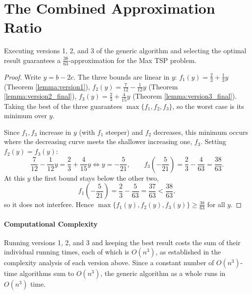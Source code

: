 \section{The Combined Approximation Ratio}
\begin{theorem} \label{thm:final_approximation}
Executing versions 1, 2, and 3 of the generic algorithm and selecting the
optimal result guarantees a $\frac{38}{63}$-approximation for the Max TSP
problem.
\end{theorem}

\begin{proof}
Write $y = b - 2c$. The three bounds are linear in $y$: $f_1(y) =
\frac23+\frac13y$ (Theorem \ref{lemma:version1}), $f_2(y) =
\frac{7}{12}-\frac1{12}y$ (Theorem \ref{lemma:version2_final}), $f_3(y) =
\frac23+\frac4{15}y$ (Theorem \ref{lemma:version3_final}). Taking the best of
the three guarantees $\max\{f_1,f_2,f_3\}$, so the worst case is its minimum
over $y$.

Since $f_1, f_3$ increase in $y$ (with $f_1$ steeper) and $f_2$ decreases, this
minimum occurs where the decreasing curve meets the shallower increasing one,
$f_3$. Setting $f_2(y) = f_3(y)$:
\begin{equation}
\frac{7}{12}-\frac{1}{12}y = \frac23+\frac4{15}y \iff y = -\frac{5}{21}, \qquad f_3\left(-\frac{5}{21}\right) = \frac23-\frac{4}{63} = \frac{38}{63}.
\end{equation}
At this $y$ the first bound stays below the other two,
\begin{equation}
f_1\left(-\frac{5}{21}\right) = \frac23-\frac{5}{63} = \frac{37}{63} < \frac{38}{63},
\end{equation}
so it does not interfere. Hence $\max\{f_1(y),f_2(y),f_3(y)\} \ge \frac{38}{63}$
for all $y$.
\end{proof}

\paragraph{Computational Complexity}
Running versions 1, 2, and 3 and keeping the best result costs the sum of their
individual running times, each of which is $O(n^3)$, as established in the
complexity analysis of each version above. Since a constant number of
$O(n^3)$-time algorithms sum to $O(n^3)$, the generic algorithm as a whole runs
in $O(n^3)$ time.
